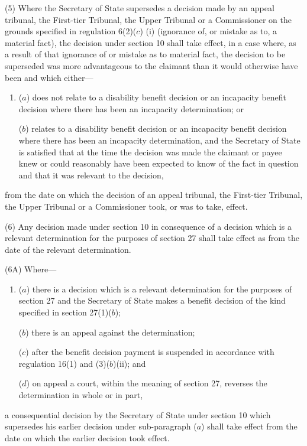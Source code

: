 \documentclass[12pt,a4paper]{article}
\begin{document}
(5) Where the Secretary of State supersedes a decision made by 
an appeal tribunal, the First-tier Tribunal, the Upper Tribunal or a Commissioner  %
on the grounds specified in regulation 6(2)($c$)%
(i)  %
(ignorance of, or mistake as to, a material fact), the decision under section 10 shall take effect, in a case where, as a result of that ignorance of or mistake as to material fact, the decision to be superseded was more advantageous to the claimant than it would otherwise have been and which either—
\begin{enumerate}\item[]
($a$) does not relate to a disability benefit decision or an incapacity benefit decision where there has been an incapacity determination; or

($b$) relates to a disability benefit decision or an incapacity benefit decision where there has been an incapacity determination, and the Secretary of State is satisfied that at the time the decision was made the claimant or payee knew or could reasonably have been expected to know of the fact in question and that it was relevant to the decision,
\end{enumerate}
from the date on which the decision of 
an appeal tribunal, the First-tier Tribunal, the Upper Tribunal or a Commissioner  %
took, or was to take, effect.

(6) Any decision made under section 10 in consequence of a decision which is a relevant determination for the purposes of section 27 shall take effect as from the date of the relevant determination.

(6A) Where—
\begin{enumerate}\item[]
($a$) there is a decision which is a relevant determination for the purposes of section 27 and the Secretary of State makes a benefit decision of the kind specified in section 27(1)($b$);

($b$) there is an appeal against the determination;

($c$) after the benefit decision payment is suspended in accordance with regulation 16(1) and (3)($b$)(ii); and

($d$) on appeal a court, within the meaning of section 27, reverses the determination in whole or in part,
\end{enumerate}
a consequential decision by the Secretary of State under section 10 which supersedes his earlier decision under sub-paragraph ($a$)  shall take effect from the date on which the earlier decision took effect.
\end{document}
